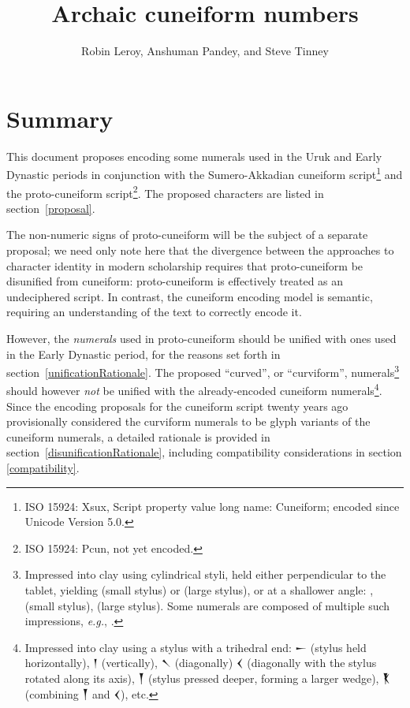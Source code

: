\documentclass[10pt, a4paper, twoside]{article}
\title{Archaic cuneiform numbers}
\author{Robin Leroy, Anshuman Pandey, and Steve Tinney}
\newcommand\oneAšC{{\proposalfont\symbol{"12550}}} %
\newcommand\oneDišC{{\proposalfont\symbol{"12559}}}
\newcommand\oneUC{{\proposalfont\symbol{"12562}}}
\newcommand\oneŊešTwoC{{\proposalfont\symbol{"1256B}}}
\newcommand\oneŊešʾuC{{\proposalfont\symbol{"12574}}}
\newcommand\oneŠarTwoC{{\proposalfont\symbol{"12579}}}
\newcommand\oneŠarʾuC{{\proposalfont\symbol{"12582}}}
\newcommand{\exempligratia}{\emph{e.g.}}
\begin{document}
\maketitle

\tableofcontents

\section{Summary}

This document proposes encoding some numerals used in the Uruk and Early Dynastic periods in conjunction
with the Sumero-Akkadian cuneiform script\footnote{ISO 15924: Xsux, Script property value long name: Cuneiform; encoded since Unicode Version 5.0.}
and the proto-cuneiform script\footnote{ISO 15924: Pcun, not yet encoded.}.
The proposed characters are listed in section~\ref{proposal}.

The non-numeric signs of proto-cuneiform will be the subject of a separate proposal;
we need only note here that the divergence between the approaches to character identity
in modern scholarship requires that proto-cuneiform be disunified from cuneiform:
proto-cuneiform is effectively treated as an undeciphered script.
In contrast, the cuneiform encoding model is semantic,
requiring an understanding of the text to correctly encode it.

However, the \emph{numerals} used in proto-cuneiform should be unified with
ones used in the Early Dynastic period, for the reasons set forth in
section~\ref{unificationRationale}.
The proposed ``curved'', or ``curviform'', numerals\footnote{%
Impressed into clay using cylindrical styli,
held either perpendicular to the tablet, yielding
\oneUC{} (small stylus) or
\oneŠarTwoC{} (large stylus),
or at a shallower angle:
\oneAšC, \oneDišC{} (small stylus),
\oneŊešTwoC{} (large stylus).
Some numerals are composed of multiple such impressions,
\exempligratia, \oneŊešʾuC.}
should however \emph{not} be unified with
the already-encoded cuneiform numerals\footnote{%
Impressed into clay using a stylus with a trihedral end:
{\xsuxfont 𒀸} (stylus held horizontally),
{\xsuxfont 𒁹} (vertically),
{\xsuxfont 𒀹} (diagonally)
{\xsuxfont 𒌋} (diagonally with the stylus rotated along its axis),
{\xsuxfont 𒐕} (stylus pressed deeper, forming a larger wedge),
{\xsuxfont 𒐞} (combining {\xsuxfont 𒐕} and {\xsuxfont 𒌋}), etc.}.
Since the encoding proposals for the cuneiform script
twenty years ago provisionally considered the curviform numerals
to be glyph variants of the cuneiform numerals,
a detailed rationale is provided in section~\ref{disunificationRationale},
including compatibility considerations in section \ref{compatibility}.
\end{document}
